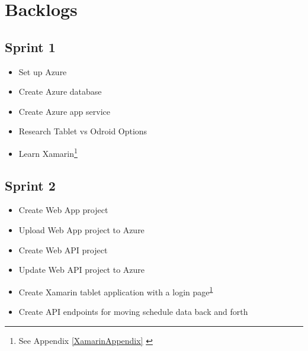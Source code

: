\section{Backlogs}

\subsection*{Sprint 1}
\begin{itemize}
	\item Set up Azure
	\item Create Azure database
	\item Create Azure app service
	\item Research Tablet vs Odroid Options
	\item Learn Xamarin\footnote{See Appendix \ref{XamarinAppendix} \label{note10}}
\end{itemize}

\subsection*{Sprint 2}
\begin{itemize}
\item Create Web App project
\item Upload Web App project to Azure
\item Create Web API project
\item Update Web API project to Azure
\item Create Xamarin tablet application with a login page\textsuperscript{\ref{note10}}
\item Create API endpoints for moving schedule data back and forth
\end{itemize}

